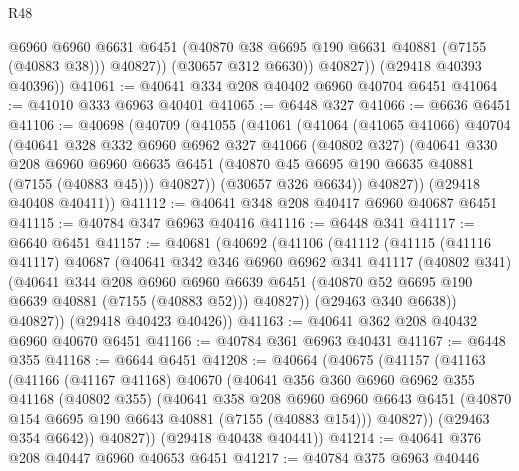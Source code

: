 \begin{lexlean}{R48}
\begin{coremodule}
                @6960
                @6960
                @6631
                @6451
                (@40870 @38 @6695 @190 @6631 @40881 (@7155 (@40883 @38)))
                @40827))
            (@30657 @312 @6630))
          @40827))
      (@29418 @40393 @40396))
@41061 := @40641 @334 @208 @40402 @6960 @40704 @6451
@41064 := @41010 @333 @6963 @40401
@41065 := @6448 @327
@41066 := @6636 @6451
@41106 := @40698
    (@40709
      (@41055
        (@41061
          (@41064
            (@41065 @41066)
            @40704
            (@40641
              @328
              @332
              @6960
              @6962
              @327
              @41066
              (@40802 @327)
              (@40641
                @330
                @208
                @6960
                @6960
                @6635
                @6451
                (@40870 @45 @6695 @190 @6635 @40881 (@7155 (@40883 @45)))
                @40827))
            (@30657 @326 @6634))
          @40827))
      (@29418 @40408 @40411))
@41112 := @40641 @348 @208 @40417 @6960 @40687 @6451
@41115 := @40784 @347 @6963 @40416
@41116 := @6448 @341
@41117 := @6640 @6451
@41157 := @40681
    (@40692
      (@41106
        (@41112
          (@41115
            (@41116 @41117)
            @40687
            (@40641
              @342
              @346
              @6960
              @6962
              @341
              @41117
              (@40802 @341)
              (@40641
                @344
                @208
                @6960
                @6960
                @6639
                @6451
                (@40870 @52 @6695 @190 @6639 @40881 (@7155 (@40883 @52)))
                @40827))
            (@29463 @340 @6638))
          @40827))
      (@29418 @40423 @40426))
@41163 := @40641 @362 @208 @40432 @6960 @40670 @6451
@41166 := @40784 @361 @6963 @40431
@41167 := @6448 @355
@41168 := @6644 @6451
@41208 := @40664
    (@40675
      (@41157
        (@41163
          (@41166
            (@41167 @41168)
            @40670
            (@40641
              @356
              @360
              @6960
              @6962
              @355
              @41168
              (@40802 @355)
              (@40641
                @358
                @208
                @6960
                @6960
                @6643
                @6451
                (@40870 @154 @6695 @190 @6643 @40881 (@7155 (@40883 @154)))
                @40827))
            (@29463 @354 @6642))
          @40827))
      (@29418 @40438 @40441))
@41214 := @40641 @376 @208 @40447 @6960 @40653 @6451
@41217 := @40784 @375 @6963 @40446

\end{coremodule}
\end{lexlean}
